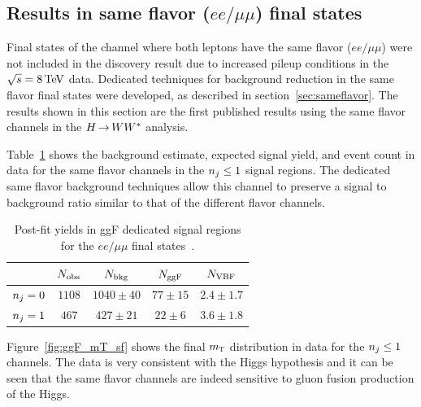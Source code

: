 \subsection{Results in same flavor ($ee/\mu\mu$) final states}

Final states of the \HWWfull channel where both leptons have the same flavor ($ee/\mu\mu$) were not included in the discovery result due to increased pileup conditions in the $\sqrt{s} = 8 \TeV$ data. Dedicated techniques for background reduction in the same flavor final states were developed, as described in section~\ref{sec:sameflavor}. The results shown in this section are the first published results using the same flavor channels in the $H{\,{\rightarrow}\,}WW^\ast$ analysis. 

Table~\ref{tab:ggF_sf} shows the background estimate, expected signal yield, and event count in data for the same flavor channels in the $n_j \leq 1$ signal regions. The dedicated same flavor background techniques allow this channel to preserve a signal to background ratio similar to that of the different flavor channels. 

\begin{table}[h!]
\centering
\captionsetup{justification=centering}

\hspace{-10pt}
\begin{tabular}{|c|c|c|c|c|}
\hline
 & $N_{\rm obs}$ & $N_{\rm bkg}$ & $N_{\rm ggF}$ & $N_{\rm VBF}$ \\ \hline
$n_j = 0$ & $1108$ & $1040 \pm 40$ & $77 \pm 15$ & $2.4 \pm 1.7$ \\ \hline
$n_j = 1$ & $467$ & $427 \pm 21$ & $22 \pm 6$ & $3.6 \pm 1.8$ \\ \hline
\end{tabular}

\caption{
Post-fit yields in ggF dedicated signal regions for the $ee/\mu\mu$ final states~\cite{WW2015}. 
}
\label{tab:ggF_sf}
\end{table}

Figure~\ref{fig:ggF_mT_sf} shows the final $m_{\textrm{\footnotesize\sc t}}$ distribution in data for the $n_j \leq 1$ channels. The data is very consistent with the Higgs hypothesis and it can be seen that the same flavor channels are indeed sensitive to gluon fusion production of the Higgs. 

